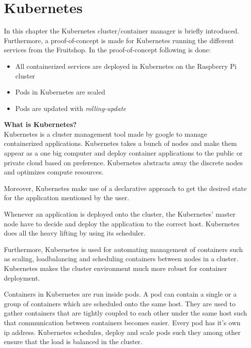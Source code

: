 \chapter{Kubernetes}\label{ch:kubernetes}
In this chapter the Kubernetes cluster/container manager is briefly introduced. Furthermore, a proof-of-concept is made for Kubernetes running the different services from the Fruitshop. In the proof-of-concept following is done:
\begin{itemize}
	\item  All containerized services are deployed in Kubernetes on the Raspberry Pi cluster 
	\item Pods in Kubernetes are scaled 
	\item Pods are updated with \emph{rolling-update} 
\end{itemize}

\textbf{What is Kubernetes?}\\
Kubernetes is a cluster management tool made by google to manage containerized applications. Kubernetes takes a bunch of nodes and make them appear as a one big computer and deploy container applications to the public or private cloud based on preference. Kubernetes abstracts away the discrete nodes and optimizes compute resources.  

Moreover, Kubernetes make use of a declarative approach to get the desired state for the application mentioned by the user. 

Whenever an application is deployed onto the cluster, the Kubernetes' master node have to decide and deploy the application to the correct host. Kubernetes does all the heavy lifting by using its scheduler. 

Furthermore, Kubernetes is used for automating management of containers such as scaling, loadbalancing and scheduling containers between nodes in a cluster. Kubernetes makes the cluster environment much more robust for container deployment.

Containers in Kubernetes are run inside pods. A pod can contain a single or a group of containers which are scheduled onto the same host. They are used to gather containers that are tightly coupled to each other under the same host such that communication between containers becomes easier. Every pod has it's own ip address. Kubernetes schedules, deploy and scale pods such they among other ensure that the load is balanced in the cluster. 

